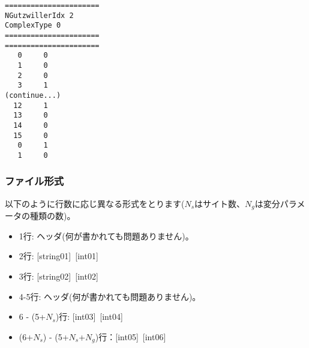 \begin{minipage}{12.5cm}
\begin{screen}
\begin{verbatim}
======================
NGutzwillerIdx 2  
ComplexType 0
====================== 
====================== 
   0     0
   1     0
   2     0
   3     1
(continue...)
  12     1
  13     0
  14     0
  15     0
   0     1
   1     0
\end{verbatim}
\end{screen}
\end{minipage}

\subsubsection{ファイル形式}
以下のように行数に応じ異なる形式をとります($N_s$はサイト数、$N_g$は変分パラメータの種類の数)。
 \begin{itemize}
   \item  1行:  ヘッダ(何が書かれても問題ありません)。
   \item  2行:   [string01]~[int01]
   \item  3行:   [string02]~[int02]
   \item  4-5行:  ヘッダ(何が書かれても問題ありません)。
   \item  6 - (5+$N_s$)行: [int03]~[int04]
   \item  (6+$N_s$) - (5+$N_s$+$N_g$)行：[int05]~[int06]
  \end{itemize}
